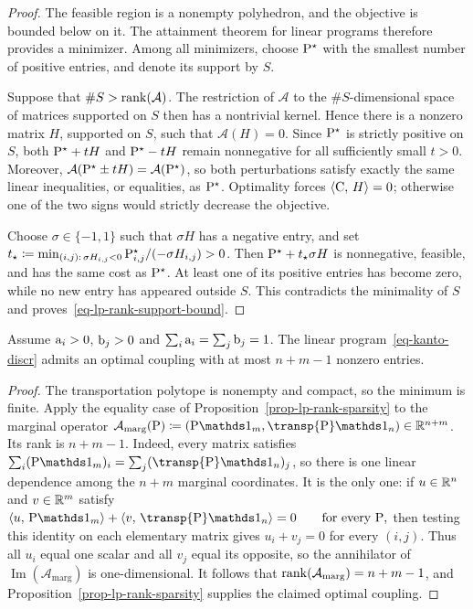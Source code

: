 \begin{proof}
The feasible region is a nonempty polyhedron, and the objective is bounded below on it. The attainment theorem for linear programs therefore provides a minimizer. Among all minimizers, choose $\P^\star$ with the smallest number of positive entries, and denote its support by $S$.

Suppose that $\#S>\rank(\mathcal A)$. The restriction of $\mathcal A$ to the $\#S$-dimensional space of matrices supported on $S$ then has a nontrivial kernel. Hence there is a nonzero matrix $H$, supported on $S$, such that $\mathcal A(H)=0$. Since $\P^\star$ is strictly positive on $S$, both $\P^\star+tH$ and $\P^\star-tH$ remain nonnegative for all sufficiently small $t>0$. Moreover, $\mathcal A(\P^\star\pm tH)=\mathcal A(\P^\star)$, so both perturbations satisfy exactly the same linear inequalities, or equalities, as $\P^\star$. Optimality forces $\dotp{\C}{H}=0$; otherwise one of the two signs would strictly decrease the objective.

Choose $\sigma\in\{-1,1\}$ such that $\sigma H$ has a negative entry, and set $t_\star\eqdef\min_{(i,j):\,\sigma H_{i,j}<0}\P^\star_{i,j}/(-\sigma H_{i,j})>0$.
Then $\P^\star+t_\star\sigma H$ is nonnegative, feasible, and has the same cost as $\P^\star$. At least one of its positive entries has become zero, while no new entry has appeared outside $S$. This contradicts the minimality of $S$ and proves~\eqref{eq-lp-rank-support-bound}.
\end{proof}
\begin{prop}\label{prop-sparse-optimal-plans}
Assume $\a_i>0$, $\b_j>0$ and $\sum_i \a_i=\sum_j \b_j=1$. The linear program~\eqref{eq-kanto-discr} admits an optimal coupling with at most $n+m-1$ nonzero entries.
\end{prop}
\begin{proof}
The transportation polytope is nonempty and compact, so the minimum is finite. Apply the equality case of Proposition~\ref{prop-lp-rank-sparsity} to the marginal operator $\mathcal A_{\mathrm{marg}}(\P)\eqdef(\P\ones_m,\transp{\P}\ones_n)\in\RR^{n+m}$.
Its rank is $n+m-1$. Indeed, every matrix satisfies
$\sum_i(\P\ones_m)_i=\sum_j(\transp{\P}\ones_n)_j$, so there is one linear dependence among the $n+m$ marginal coordinates. It is the only one: if $u\in\RR^n$ and $v\in\RR^m$ satisfy
\(\dotp{u}{\P\ones_m} + \dotp{v}{\transp{\P}\ones_n}=0 \qquad\text{for every }\P,\)
then testing this identity on each elementary matrix gives $u_i+v_j=0$ for every $(i,j)$. Thus all $u_i$ equal one scalar and all $v_j$ equal its opposite, so the annihilator of $\operatorname{Im}(\mathcal A_{\mathrm{marg}})$ is one-dimensional. It follows that $\rank(\mathcal A_{\mathrm{marg}})=n+m-1$, and Proposition~\ref{prop-lp-rank-sparsity} supplies the claimed optimal coupling.
\end{proof}
